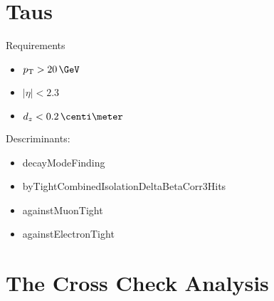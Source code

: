 \section{Taus}

Requirements
\begin{itemize}
  \item $\pt > 20 \,\GeV$
  \item $|\eta|<2.3$
  \item $d_z<0.2 \,\centi\meter$
\end{itemize}

Descriminants:
\begin{itemize}
  \item decayModeFinding
  \item byTightCombinedIsolationDeltaBetaCorr3Hits
  \item againstMuonTight
  \item againstElectronTight
\end{itemize}

\section{The Cross Check Analysis}

